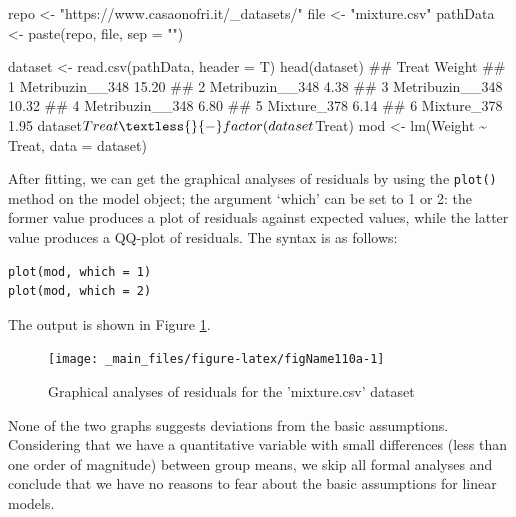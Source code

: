 \documentclass[a4paper,12pt,oneside]{book}
\newenvironment{Shaded}{\begin{snugshade}}{\end{snugshade}}
\newcommand{\SpecialCharTok}[1]{#1}
\newcommand{\StringTok}[1]{#1}
\newcommand{\DocumentationTok}[1]{#1}
\newcommand{\OtherTok}[1]{#1}
\newcommand{\FunctionTok}[1]{#1}
\newcommand{\AttributeTok}[1]{#1}
\newcommand{\NormalTok}[1]{#1}
\begin{document}
\begin{Shaded}
\begin{Highlighting}[]
\NormalTok{repo }\OtherTok{\textless{}{-}} \StringTok{"https://www.casaonofri.it/\_datasets/"}
\NormalTok{file }\OtherTok{\textless{}{-}} \StringTok{"mixture.csv"}
\NormalTok{pathData }\OtherTok{\textless{}{-}} \FunctionTok{paste}\NormalTok{(repo, file, }\AttributeTok{sep =} \StringTok{""}\NormalTok{)}

\NormalTok{dataset }\OtherTok{\textless{}{-}} \FunctionTok{read.csv}\NormalTok{(pathData, }\AttributeTok{header =}\NormalTok{ T)}
\FunctionTok{head}\NormalTok{(dataset)}
\DocumentationTok{\#\#             Treat Weight}
\DocumentationTok{\#\# 1 Metribuzin\_\_348  15.20}
\DocumentationTok{\#\# 2 Metribuzin\_\_348   4.38}
\DocumentationTok{\#\# 3 Metribuzin\_\_348  10.32}
\DocumentationTok{\#\# 4 Metribuzin\_\_348   6.80}
\DocumentationTok{\#\# 5     Mixture\_378   6.14}
\DocumentationTok{\#\# 6     Mixture\_378   1.95}
\NormalTok{dataset}\SpecialCharTok{$}\NormalTok{Treat }\OtherTok{\textless{}{-}} \FunctionTok{factor}\NormalTok{(dataset}\SpecialCharTok{$}\NormalTok{Treat)}
\NormalTok{mod }\OtherTok{\textless{}{-}} \FunctionTok{lm}\NormalTok{(Weight }\SpecialCharTok{\textasciitilde{}}\NormalTok{ Treat, }\AttributeTok{data =}\NormalTok{ dataset)}
\end{Highlighting}
\end{Shaded}

After fitting, we can get the graphical analyses of residuals by using the \texttt{plot()} method on the model object; the argument `which' can be set to 1 or 2: the former value produces a plot of residuals against expected values, while the latter value produces a QQ-plot of residuals. The syntax is as follows:

\begin{verbatim}
plot(mod, which = 1)
plot(mod, which = 2)
\end{verbatim}

The output is shown in Figure \ref{fig:figName110a}.

\begin{figure}

{\centering \texttt{[image: \_main\_files/figure-latex/figName110a-1]} 

}

\caption{Graphical analyses of residuals for the 'mixture.csv' dataset}\label{fig:figName110a}
\end{figure}

None of the two graphs suggests deviations from the basic assumptions. Considering that we have a quantitative variable with small differences (less than one order of magnitude) between group means, we skip all formal analyses and conclude that we have no reasons to fear about the basic assumptions for linear models.
\end{document}
